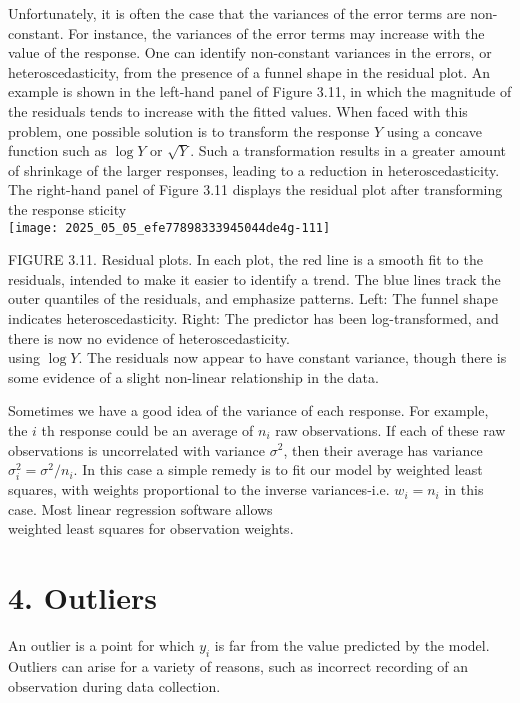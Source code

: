 \documentclass[10pt]{article}
\begin{document}
Unfortunately, it is often the case that the variances of the error terms are non-constant. For instance, the variances of the error terms may increase with the value of the response. One can identify non-constant variances in the errors, or heteroscedasticity, from the presence of a funnel shape in the residual plot. An example is shown in the left-hand panel of Figure 3.11, in which the magnitude of the residuals tends to increase with the fitted values. When faced with this problem, one possible solution is to transform the response $Y$ using a concave function such as $\log Y$ or $\sqrt{Y}$. Such a transformation results in a greater amount of shrinkage of the larger responses, leading to a reduction in heteroscedasticity. The right-hand panel of Figure 3.11 displays the residual plot after transforming the response 
sticity\\
\texttt{[image: 2025\_05\_05\_efe77898333945044de4g-111]}

FIGURE 3.11. Residual plots. In each plot, the red line is a smooth fit to the residuals, intended to make it easier to identify a trend. The blue lines track the outer quantiles of the residuals, and emphasize patterns. Left: The funnel shape indicates heteroscedasticity. Right: The predictor has been log-transformed, and there is now no evidence of heteroscedasticity.\\
using $\log Y$. The residuals now appear to have constant variance, though there is some evidence of a slight non-linear relationship in the data.

Sometimes we have a good idea of the variance of each response. For example, the $i$ th response could be an average of $n_{i}$ raw observations. If each of these raw observations is uncorrelated with variance $\sigma^{2}$, then their average has variance $\sigma_{i}^{2}=\sigma^{2} / n_{i}$. In this case a simple remedy is to fit our model by weighted least squares, with weights proportional to the inverse variances-i.e. $w_{i}=n_{i}$ in this case. Most linear regression software allows\\
weighted least squares for observation weights.

\section*{4. Outliers}
An outlier is a point for which $y_{i}$ is far from the value predicted by the model. Outliers can arise for a variety of reasons, such as incorrect recording of an observation during data collection.
\end{document}
